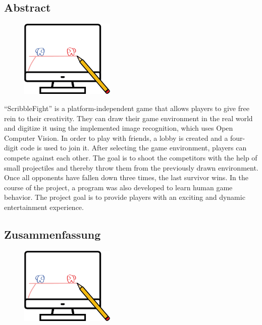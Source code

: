 \begin{spacing}{1}
  \chapter*{Abstract}
\end{spacing}
\begin{figure}
  \begin{center}
    \includegraphics[width=0.4\textwidth]{pics/icon.png}
  \end{center}
\end{figure}
``ScribbleFight'' is a platform-independent game that allows players to give free rein to their creativity.
They can draw their game environment in the real world and digitize it using the implemented image recognition, which uses Open Computer Vision.
In order to play with friends, a lobby is created and a four-digit code is used to join it.
After selecting the game environment, players can compete against each other.
The goal is to shoot the competitors with the help of small projectiles and thereby throw them from the previously drawn environment.
Once all opponents have fallen down three times, the last survivor wins.
In the course of the project, a program was also developed to learn human game behavior.
The project goal is to provide players with an exciting and dynamic entertainment experience.
\newpage
\begin{spacing}{1}
  \chapter*{Zusammenfassung}
\end{spacing}
\begin{figure}
  \begin{center}
    \includegraphics[width=0.4\textwidth]{pics/icon.png}
  \end{center}
\end{figure}
